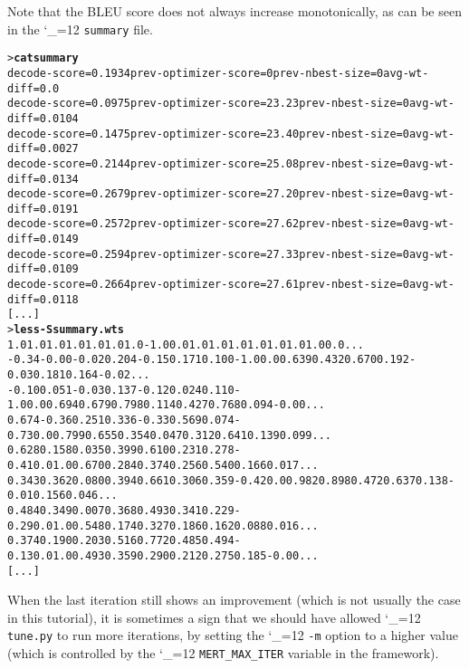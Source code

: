 \documentclass[11pt,letterpaper]{article}
\def\code{\begingroup\catcode`\_=12 \codex}
\newcommand{\codex}[1]{\texttt{#1}\endgroup}
\begin{document}
Note that the BLEU score does not always increase monotonically, as can
be seen in the \code{summary} file.
\begin{footnotesize}
\begin{alltt}
> \textbf{cat summary}
decode-score=0.1934 prev-optimizer-score=0 prev-nbest-size=0 avg-wt-diff=0.0
decode-score=0.0975 prev-optimizer-score=23.23 prev-nbest-size=0 avg-wt-diff=0.0104
decode-score=0.1475 prev-optimizer-score=23.40 prev-nbest-size=0 avg-wt-diff=0.0027
decode-score=0.2144 prev-optimizer-score=25.08 prev-nbest-size=0 avg-wt-diff=0.0134
decode-score=0.2679 prev-optimizer-score=27.20 prev-nbest-size=0 avg-wt-diff=0.0191
decode-score=0.2572 prev-optimizer-score=27.62 prev-nbest-size=0 avg-wt-diff=0.0149
decode-score=0.2594 prev-optimizer-score=27.33 prev-nbest-size=0 avg-wt-diff=0.0109
decode-score=0.2664 prev-optimizer-score=27.61 prev-nbest-size=0 avg-wt-diff=0.0118
[...]
> \textbf{less -S summary.wts}
1.0   1.0   1.0   1.0   1.0   1.0   1.0   -1.0  0.0 1.0   1.0   1.0   1.0   1.0   1.0   1.0   0.0   ...
-0.34 -0.00 -0.02 0.204 -0.15 0.171 0.100 -1.0  0.0 0.639 0.432 0.670 0.192 -0.03 0.181 0.164 -0.02 ...
-0.10 0.051 -0.03 0.137 -0.12 0.024 0.110 -1.0  0.0 0.694 0.679 0.798 0.114 0.427 0.768 0.094 -0.00 ...
0.674 -0.36 0.251 0.336 -0.33 0.569 0.074 -0.73 0.0 0.799 0.655 0.354 0.047 0.312 0.641 0.139 0.099 ...
0.628 0.158 0.035 0.399 0.610 0.231 0.278 -0.41 0.0 1.0   0.670 0.284 0.374 0.256 0.540 0.166 0.017 ...
0.343 0.362 0.080 0.394 0.661 0.306 0.359 -0.42 0.0 0.982 0.898 0.472 0.637 0.138 -0.01 0.156 0.046 ...
0.484 0.349 0.007 0.368 0.493 0.341 0.229 -0.29 0.0 1.0   0.548 0.174 0.327 0.186 0.162 0.088 0.016 ...
0.374 0.190 0.203 0.516 0.772 0.485 0.494 -0.13 0.0 1.0   0.493 0.359 0.290 0.212 0.275 0.185 -0.00 ...
[...]
\end{alltt}
\end{footnotesize}
When the last iteration still shows an improvement (which is not usually the
case in this tutorial), it is sometimes a sign that we should have allowed
\code{tune.py} to run more iterations, by setting the \code{-m} option to a
higher value (which is controlled by the \code{MERT_MAX_ITER} variable in the
framework).
\end{document}
